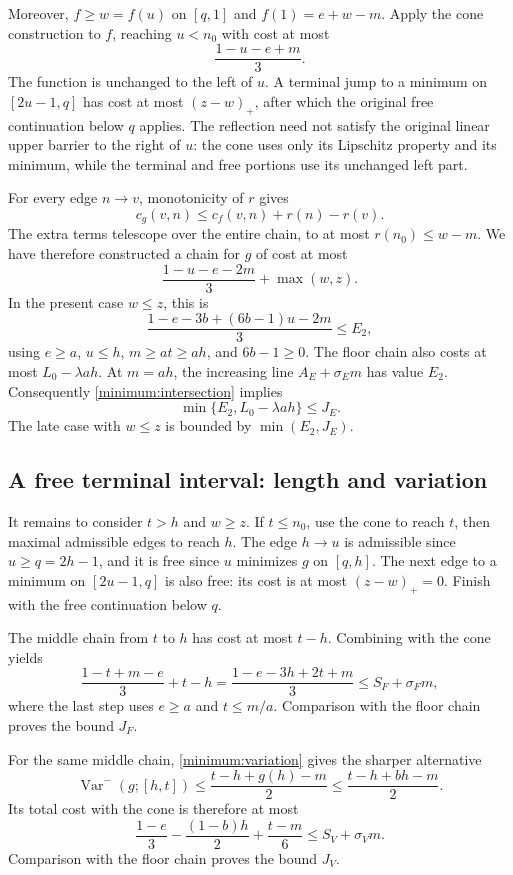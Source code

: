 Moreover, \(f\ge w=f(u)\) on \([q,1]\) and
\(f(1)=e+w-m\). Apply the cone construction to \(f\), reaching
\(u<n_0\) with cost at most
\[
 \frac{1-u-e+m}{3}.
\]
The function is unchanged to the left of \(u\). A terminal jump
to a minimum on \([2u-1,q]\) has cost at most \((z-w)_+\), after
which the original free continuation below \(q\) applies. The
reflection need not satisfy the original linear upper barrier to the
right of \(u\): the cone uses only its Lipschitz property and its
minimum, while the terminal and free portions use its unchanged left part.

For every edge \(n\to v\), monotonicity of \(r\) gives
\[
 c_g(v,n)\le c_f(v,n)+r(n)-r(v).
\]
The extra terms telescope over the entire chain, to at most
\(r(n_0)\le w-m\). We have therefore constructed a chain for \(g\)
of cost at most
\begin{equation}\label{minimum:reflection}
 \frac{1-u-e-2m}{3}+\max(w,z).
\end{equation}
In the present case \(w\le z\), this is
\[
 \frac{1-e-3b+(6b-1)u-2m}{3}\le E_2,
\]
using \(e\ge a\), \(u\le h\), \(m\ge at\ge ah\), and
\(6b-1\ge0\). The floor chain also costs at most
\(L_0-\lambda ah\). At \(m=ah\), the increasing line
\(A_E+\sigma_E m\) has value \(E_2\). Consequently
\eqref{minimum:intersection} implies
\[
 \min\{E_2,L_0-\lambda ah\}\le J_E.
\]
The late case with \(w\le z\) is bounded by \(\min(E_2,J_E)\).

\subsection{A free terminal interval: length and variation}
It remains to consider \(t>h\) and \(w\ge z\). If \(t\le n_0\),
use the cone to reach \(t\), then maximal admissible edges to reach
\(h\). The edge \(h\to u\) is admissible since \(u\ge q=2h-1\),
and it is free since \(u\) minimizes \(g\) on \([q,h]\). The next
edge to a minimum on \([2u-1,q]\) is also free: its cost is at most
\((z-w)_+=0\). Finish with the free continuation below \(q\).

The middle chain from \(t\) to \(h\) has cost at most \(t-h\).
Combining with the cone yields
\[
 \frac{1-t+m-e}{3}+t-h
 =\frac{1-e-3h+2t+m}{3}
 \le S_F+\sigma_F m,
\]
where the last step uses \(e\ge a\) and \(t\le m/a\).
Comparison with the floor chain proves the bound \(J_F\).

For the same middle chain, \eqref{minimum:variation} gives the sharper
alternative
\[
 \operatorname{Var}^-(g;[h,t])
 \le\frac{t-h+g(h)-m}{2}
 \le\frac{t-h+bh-m}{2}.
\]
Its total cost with the cone is therefore at most
\[
 \frac{1-e}{3}-\frac{(1-b)h}{2}+\frac{t-m}{6}
 \le S_V+\sigma_Vm.
\]
Comparison with the floor chain proves the bound \(J_V\).

